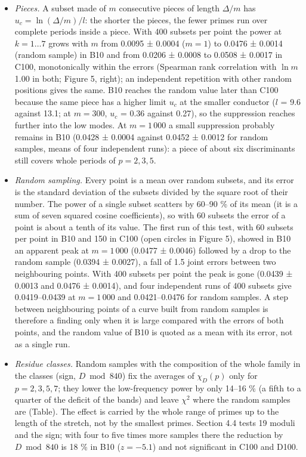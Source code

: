 \documentclass[
  10pt,
]{article}
\providecommand{\tightlist}{%
  \setlength{\itemsep}{0pt}\setlength{\parskip}{0pt}}
\begin{document}
\begin{itemize}
\tightlist
\item
  \emph{Pieces.} A subset made of \(m\) consecutive pieces of length
  \(\Delta/m\) has \(u_c = \ln(\Delta/m)/l\): the shorter the pieces,
  the fewer primes run over complete periods inside a piece. With 400
  subsets per point the power at \(k = 1 \dots 7\) grows with \(m\) from
  0.0095 ± 0.0004 (\(m = 1\)) to 0.0476 ± 0.0014 (random sample) in B10
  and from 0.0206 ± 0.0008 to 0.0508 ± 0.0017 in C100, monotonically
  within the errors (Spearman rank correlation with \(\ln m\) 1.00 in
  both; Figure 5, right); an independent repetition with other random
  positions gives the same. B10 reaches the random value later than C100
  because the same piece has a higher limit \(u_c\) at the smaller
  conductor (\(l\) = 9.6 against 13.1; at \(m = 300\), \(u_c\) = 0.36
  against 0.27), so the suppression reaches further into the low modes.
  At \(m = 1\,000\) a small suppression probably remains in B10 (0.0428
  ± 0.0004 against 0.0452 ± 0.0012 for random samples, means of four
  independent runs): a piece of about six discriminants still covers
  whole periods of \(p = 2, 3, 5\).
\item
  \emph{Random sampling.} Every point is a mean over random subsets, and
  its error is the standard deviation of the subsets divided by the
  square root of their number. The power of a single subset scatters by
  60--90 \% of its mean (it is a sum of seven squared cosine
  coefficients), so with 60 subsets the error of a point is about a
  tenth of its value. The first run of this test, with 60 subsets per
  point in B10 and 150 in C100 (open circles in Figure 5), showed in B10
  an apparent peak at \(m = 1\,000\) (0.0477 ± 0.0046) followed by a
  drop to the random sample (0.0394 ± 0.0027), a fall of 1.5 joint
  errors between two neighbouring points. With 400 subsets per point the
  peak is gone (0.0439 ± 0.0013 and 0.0476 ± 0.0014), and four
  independent runs of 400 subsets give 0.0419--0.0439 at \(m = 1\,000\)
  and 0.0421--0.0476 for random samples. A step between neighbouring
  points of a curve built from random samples is therefore a finding
  only when it is large compared with the errors of both points, and the
  random value of B10 is quoted as a mean with its error, not as a
  single run.
\item
  \emph{Residue classes.} Random samples with the composition of the
  whole family in the classes (sign, \(D \bmod 840\)) fix the averages
  of \(\chi_D(p)\) only for \(p = 2, 3, 5, 7\); they lower the
  low-frequency power by only 14--16 \% (a fifth to a quarter of the
  deficit of the bands) and leave \(\chi^2\) where the random samples
  are (Table). The effect is carried by the whole range of primes up to
  the length of the stretch, not by the smallest primes. Section 4.4
  tests 19 moduli and the sign; with four to five times more samples
  there the reduction by \(D \bmod 840\) is 18 \% in B10 (\(z = -5.1\))
  and not significant in C100 and D100.
\end{itemize}
\end{document}
